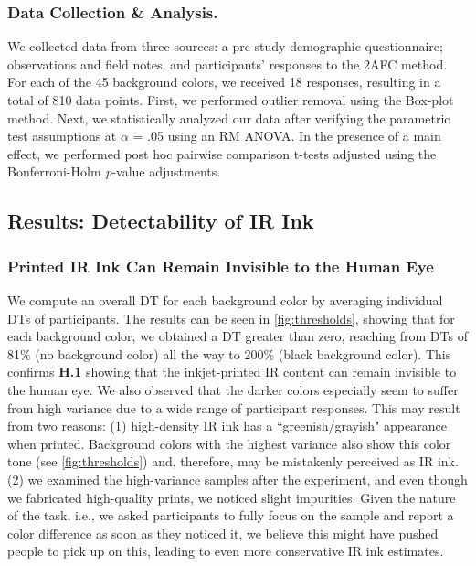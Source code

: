 \subsubsection{Data Collection \& Analysis.}
We collected data from three sources: a pre-study demographic questionnaire; observations and field notes, and participants' responses to the 2AFC method. For each of the 45 background colors, we received 18 responses, resulting in a total of 810 data points. First, we performed outlier removal using the Box-plot method. Next, we statistically analyzed our data after verifying the parametric test assumptions at $\alpha$ = .05 using an RM ANOVA. In the presence of a main effect, we performed post hoc pairwise comparison t-tests adjusted using the Bonferroni-Holm \textit{p}-value adjustments.




\subsection{Results: Detectability of IR Ink}

\subsubsection{Printed IR Ink Can Remain Invisible to the Human Eye}
We compute an overall DT for each background color by averaging individual DTs of participants. The results can be seen in \autoref{fig:thresholds}, showing that for each background color, we obtained a DT greater than zero, reaching from DTs of 81\% (no background color) all the way to 200\% (black background color). This confirms \textbf{H.1} showing that the inkjet-printed IR content can remain invisible to the human eye. We also observed that the darker colors especially seem to suffer from high variance due to a wide range of participant responses. This may result from two reasons: (1) high-density IR ink has a ``greenish/grayish" appearance when printed. Background colors with the highest variance also show this color tone (see \autoref{fig:thresholds}) and, therefore, may be mistakenly perceived as IR ink. (2) we examined the high-variance samples after the experiment, and even though we fabricated high-quality prints, we noticed slight impurities. Given the nature of the task, i.e., we asked participants to fully focus on the sample and report a color difference as soon as they noticed it, we believe this might have pushed people to pick up on this, leading to even more conservative IR ink estimates. 




